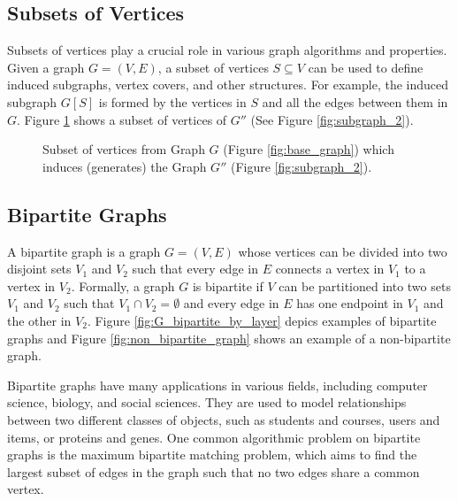         \subsection{Subsets of Vertices}
        
            Subsets of vertices play a crucial role in various graph algorithms and properties. Given a graph \( G = (V, E) \), a subset of vertices \( S \subseteq V \) can be used to define induced subgraphs, vertex covers, and other structures. For example, the induced subgraph \( G[S] \) is formed by the vertices in \( S \) and all the edges between them in \( G \). Figure \ref{fig:subset_of_vertices} shows a subset of vertices of $G''$ (See Figure \ref{fig:subgraph_2}).

            \begin{figure}[!ht]
                \centering
                \caption{Subset of vertices from Graph $G$ (Figure \ref{fig:base_graph}) which induces (generates) the Graph $G''$ (Figure \ref{fig:subgraph_2}).}
                \label{fig:subset_of_vertices}
            \end{figure}


        \subsection{Bipartite Graphs}

            A bipartite graph is a graph \( G = (V, E) \) whose vertices can be divided into two disjoint sets \( V_1 \) and \( V_2 \) such that every edge in \( E \) connects a vertex in \( V_1 \) to a vertex in \( V_2 \). Formally, a graph \( G \) is bipartite if \( V \) can be partitioned into two sets \( V_1 \) and \( V_2 \) such that \( V_1 \cap V_2 = \emptyset \) and every edge in \( E \) has one endpoint in \( V_1 \) and the other in \( V_2 \). Figure \ref{fig:G_bipartite_by_layer} depics examples of bipartite graphs and Figure \ref{fig:non_bipartite_graph} shows an example of a non-bipartite graph.
            
            Bipartite graphs have many applications in various fields, including computer science, biology, and social sciences. They are used to model relationships between two different classes of objects, such as students and courses, users and items, or proteins and genes. One common algorithmic problem on bipartite graphs is the maximum bipartite matching problem, which aims to find the largest subset of edges in the graph such that no two edges share a common vertex.
            
